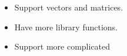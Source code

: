 \begin{itemize}
\item Support vectors and matrices.
\item Have more library functions.
\item Support more complicated 
\end{itemize}
